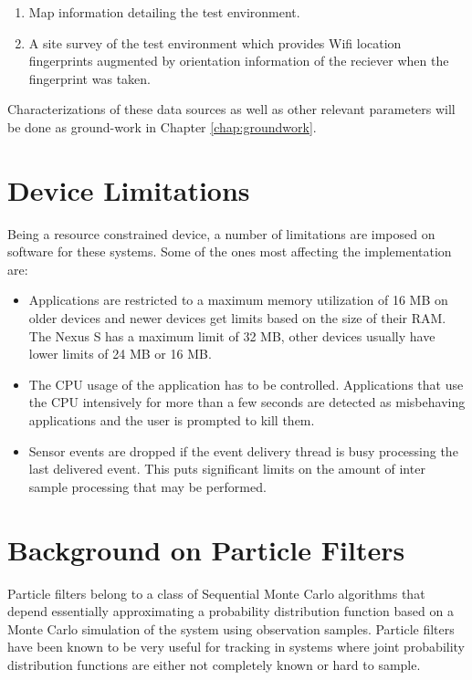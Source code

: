 \documentclass[10pt,journal,letterpaper,compsoc]{IEEEtran}
\begin{document}
\begin{enumerate}
\item Map information detailing the test environment.
\item A site survey of the test environment which provides Wifi location fingerprints augmented by 
    orientation information of the reciever when the fingerprint was taken.
\end{enumerate}

Characterizations of these data sources as well
as other relevant parameters will be done as ground-work in 
Chapter \ref{chap:groundwork}.

\section{Device Limitations\label{sec:device_limitations}}

Being a resource constrained device, a number of limitations are imposed on 
software for these systems. Some of the ones most affecting the implementation
are:

\begin{itemize}
\item Applications are restricted to a maximum memory utilization of 16 MB on 
    older devices and newer devices get limits based on the size of their 
    RAM. The Nexus S has a maximum limit of 32 MB, other devices usually have
    lower limits of 24 MB or 16 MB.
\item The CPU usage of the application has to be controlled. Applications 
    that use the CPU intensively for more than a few seconds are detected as 
    misbehaving applications and the user is prompted to kill them.
\item Sensor events are dropped if the event delivery thread is busy processing
    the last delivered event. This puts significant limits on the 
    amount of inter sample processing that may be performed.
\end{itemize}


\section{Background on Particle Filters}

Particle filters belong to a class of Sequential Monte Carlo algorithms 
that depend essentially approximating a probability distribution function based
on a Monte Carlo simulation of the system using observation samples. Particle 
filters have been known to be very useful for tracking in systems where joint
probability distribution functions are either not completely known or hard 
to sample. 
\end{document}

